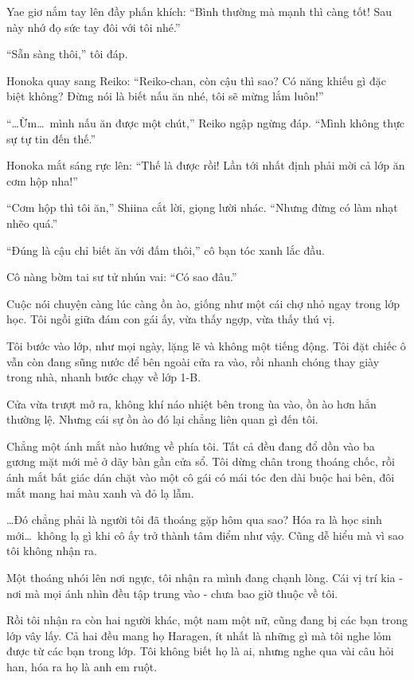 \documentclass[../main.tex]{subfiles}
\begin{document}
Yae giơ nắm tay lên đầy phấn khích: ``Bình thường mà mạnh thì càng tốt! Sau này nhớ đọ sức tay đôi với tôi nhé.''

``Sẵn sàng thôi,'' tôi đáp.

Honoka quay sang Reiko: ``Reiko-chan, còn cậu thì sao? Có năng khiếu gì đặc biệt không? Đừng nói là biết nấu ăn nhé, tôi sẽ mừng lắm luôn!''

``\dots Ừm\dots\ mình nấu ăn được một chút,'' Reiko ngập ngừng đáp. ``Mình không thực sự tự tin đến thế.''

Honoka mắt sáng rực lên: ``Thế là được rồi! Lần tới nhất định phải mời cả lớp ăn cơm hộp nha!''

``Cơm hộp thì tôi ăn,'' Shiina cắt lời, giọng lười nhác. ``Nhưng đừng có làm nhạt nhẽo quá.''

``Đúng là cậu chỉ biết ăn với đấm thôi,'' cô bạn tóc xanh lắc đầu.

Cô nàng bờm tai sư tử nhún vai: ``Có sao đâu.''

Cuộc nói chuyện càng lúc càng ồn ào, giống như một cái chợ nhỏ ngay trong lớp học. Tôi ngồi giữa đám con gái ấy, vừa thấy ngợp, vừa thấy thú vị.


Tôi bước vào lớp, như mọi ngày, lặng lẽ và không một tiếng động. Tôi đặt chiếc ô vẫn còn đang sũng nước để bên ngoài cửa ra vào, rồi nhanh chóng thay giày trong nhà, nhanh bước chạy về lớp 1-B.

Cửa vừa trượt mở ra, không khí náo nhiệt bên trong ùa vào, ồn ào hơn hẳn thường lệ. Nhưng cái sự ồn ào đó lại chẳng liên quan gì đến tôi.

Chẳng một ánh mắt nào hướng về phía tôi. Tất cả đều đang đổ dồn vào ba gương mặt mới mẻ ở dãy bàn gần cửa sổ. Tôi dừng chân trong thoáng chốc, rồi ánh mắt bất giác dán chặt vào một cô gái có mái tóc đen dài buộc hai bên, đôi mắt mang hai màu xanh và đỏ lạ lẫm.

\dots Đó chẳng phải là người tôi đã thoáng gặp hôm qua sao? Hóa ra là học sinh mới\dots\ không lạ gì khi cô ấy trở thành tâm điểm như vậy. Cũng dễ hiểu mà vì sao tôi không nhận ra.


Một thoáng nhói lên nơi ngực, tôi nhận ra mình đang chạnh lòng. Cái vị trí kia - nơi mà mọi ánh nhìn đều tập trung vào - chưa bao giờ thuộc về tôi.

Rồi tôi nhận ra còn hai người khác, một nam một nữ, cũng đang bị các bạn trong lớp vây lấy. Cả hai đều mang họ Haragen, ít nhất là những gì mà tôi nghe lỏm được từ các bạn trong lớp. Tôi không biết họ là ai, nhưng nghe qua vài câu hỏi han, hóa ra họ là anh em ruột.
\end{document}
